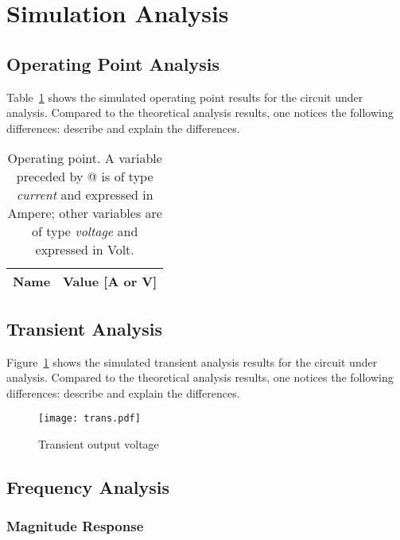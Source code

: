 \section{Simulation Analysis}
\label{sec:simulation}

\subsection{Operating Point Analysis}

Table~\ref{tab:op} shows the simulated operating point results for the circuit
under analysis. Compared to the theoretical analysis results, one notices the
following differences: describe and explain the differences.

\begin{table}[h]
  \centering
  \begin{tabular}{|l|r|}
    \hline    
    {\bf Name} & {\bf Value [A or V]} \\ \hline
    
  \end{tabular}
  \caption{Operating point. A variable preceded by @ is of type {\em current}
    and expressed in Ampere; other variables are of type {\it voltage} and expressed in
    Volt.}
  \label{tab:op}
\end{table}

\lipsum[1-1]


\subsection{Transient Analysis}

Figure~\ref{fig:trans} shows the simulated transient analysis results for the
circuit under analysis. Compared to the theoretical analysis results, one
notices the following differences: describe and explain the differences.

\begin{figure}[h] \centering
\texttt{[image: trans.pdf]}
\caption{Transient output voltage}
\label{fig:trans}
\end{figure}

\lipsum[1-1]



\subsection{Frequency Analysis}

\subsubsection{Magnitude Response}

